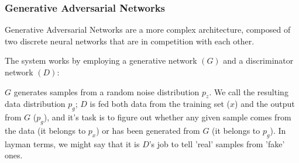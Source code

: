 

\subsubsection{Generative Adversarial Networks}
Generative Adversarial Networks are a more complex architecture, composed of two discrete neural networks that are in competition with each other.

The system works by employing a generative network $(G)$ and a discriminator network $(D)$:

$G$ generates samples from a random noise distribution $p_z$. We call the resulting data distribution $p_g$; $D$ is fed both data from the training set ($x$) and the output from $G$ ($p_g$), and it's task is to figure out whether any given sample comes from the data (it belongs to $p_x$) or has been generated from $G$ (it belongs to $p_g$). In layman terms, we might say that it is $D$'s job to tell 'real' samples from 'fake' ones.




